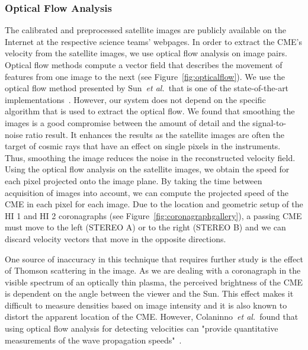 \documentclass[journal]{vgtc}                %
\def\etal{\textit{et al.}}
\begin{document}
\subsubsection{Optical Flow Analysis} \label{sec:opticalflow}
The calibrated and preprocessed satellite images are publicly available on the Internet at the respective science teams' webpages. In order to extract the CME's velocity from the satellite images, we use optical flow analysis on image pairs. Optical flow methods compute a vector field that describes the movement of features from one image to the next (see Figure~\ref{fig:opticalflow}). We use the optical flow method presented by Sun~\etal\ that is one of the state-of-the-art implementations~\cite{sun2010secrets}. However, our system does not depend on the specific algorithm that is used to extract the optical flow. We found that smoothing the images is a good compromise between the amount of detail and the signal-to-noise ratio result. It enhances the results as the satellite images are often the target of cosmic rays that have an effect on single pixels in the instruments. Thus, smoothing the image reduces the noise in the reconstructed velocity field. Using the optical flow analysis on the satellite images, we obtain the speed for each pixel projected onto the image plane. By taking the time between acquisition of images into account, we can compute the projected speed of the CME in each pixel for each image. Due to the location and geometric setup of the HI 1 and HI 2 coronagraphs (see Figure~\ref{fig:coronagraphgallery}), a passing CME must move to the left (STEREO A) or to the right (STEREO B) and we can discard velocity vectors that move in the opposite directions.

One source of inaccuracy in this technique that requires further study is the effect of Thomson scattering in the image. As we are dealing with a coronagraph in the visible spectrum of an optically thin plasma, the perceived brightness of the CME is dependent on the angle between the viewer and the Sun. This effect makes it difficult to measure densities based on image intensity and it is also known to distort the apparent location of the CME. However, Colaninno~\etal\ found that using optical flow analysis for detecting velocities can "provide quantitative measurements of the wave propagation speeds"~\cite{Colaninno:2006ef}.
\end{document}
